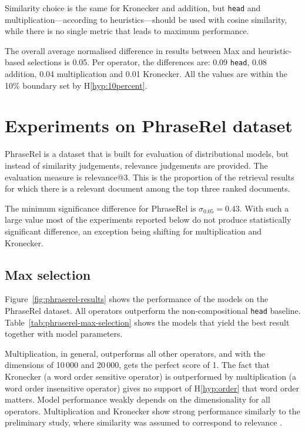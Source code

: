 Similarity choice is the same for Kronecker and addition, but \texttt{head} and multiplication---according to heuristics---should be used with cosine similarity, while there is no single metric that leads to maximum performance.

The overall average normalised difference in results between Max and heuristic-based selections is 0.05. Per operator, the differences are: 0.09 \texttt{head}, 0.08 addition, 0.04 multiplication and 0.01 Kronecker. All the values are within the 10\% boundary set by H\ref{hyp:10percent}.

\section{Experiments on PhraseRel dataset}
\label{sec:phraserel-experiment}

PhraseRel is a dataset that is built for evaluation of distributional models, but instead of similarity judgements, relevance judgements are provided. The evaluation measure is relevance@3. This is the proportion of the retrieval results for which there is a relevant document among the top three ranked documents.

The minimum significance difference for PhraseRel is $\sigma_{0.05} = 0.43$. With such a large value most of the experiments reported below do not produce statistically significant difference, an exception being shifting for multiplication and Kronecker.

\subsection{Max selection}
\label{sec:max-selection-phraserel}



Figure~\ref{fig:phraserel-results} shows the performance of the models on the PhraseRel dataset. All operators outperform the non-compositional \texttt{head} baseline. Table~\ref{tab:phraserel-max-selection} shows the models that yield the best result together with model parameters.

Multiplication, in general, outperforms all other operators, and with the dimensions of 10\,000 and 20\,000, gets the perfect score of 1\footnotemark{}. The fact that Kronecker (a word order sensitive operator) is outperformed by multiplication (a word order insensitive operator) gives no support of H\ref{hyp:order} that word order matters. Model performance weakly depends on the dimensionality for all operators. Multiplication and Kronecker show strong performance similarly to the preliminary study, where similarity was assumed to correspond to relevance \cite{Milajevs:2015:IMN:2808194.2809448}.

